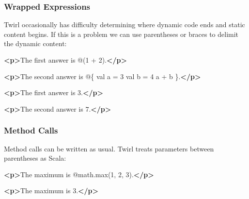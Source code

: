 \documentclass[oneside,11pt,a4paper,]{book}
\newenvironment{Shaded}{\begin{snugshade}}{\end{snugshade}}
\newcommand{\KeywordTok}[1]{\textcolor[rgb]{0.13,0.29,0.53}{\textbf{{#1}}}}
\newcommand{\NormalTok}[1]{{#1}}
\begin{document}
\subsubsection{Wrapped Expressions}\label{wrapped-expressions}

Twirl occasionally has difficulty determining where dynamic code ends
and static content begins. If this is a problem we can use parentheses
or braces to delimit the dynamic content:

\begin{multicols}{2}

\begin{Shaded}
\begin{Highlighting}[]
\KeywordTok{<p>}\NormalTok{The first answer is @(1 + 2).}\KeywordTok{</p>}

\KeywordTok{<p>}\NormalTok{The second answer is @\{}
  \NormalTok{val a = 3}
  \NormalTok{val b = 4}
  \NormalTok{a + b}
\NormalTok{\}.}\KeywordTok{</p>}
\end{Highlighting}
\end{Shaded}

\columnbreak

\begin{Shaded}
\begin{Highlighting}[]
\KeywordTok{<p>}\NormalTok{The first answer is 3.}\KeywordTok{</p>}

\KeywordTok{<p>}\NormalTok{The second answer is 7.}\KeywordTok{</p>}
\end{Highlighting}
\end{Shaded}

\end{multicols}

\subsubsection{Method Calls}\label{method-calls}

Method calls can be written as usual. Twirl treats parameters between
parentheses as Scala:

\begin{multicols}{2}

\begin{Shaded}
\begin{Highlighting}[]
\KeywordTok{<p>}\NormalTok{The maximum is @math.max(1, 2, 3).}\KeywordTok{</p>}
\end{Highlighting}
\end{Shaded}

\columnbreak

\begin{Shaded}
\begin{Highlighting}[]
\KeywordTok{<p>}\NormalTok{The maximum is 3.}\KeywordTok{</p>}
\end{Highlighting}
\end{Shaded}

\end{multicols}
\end{document}
